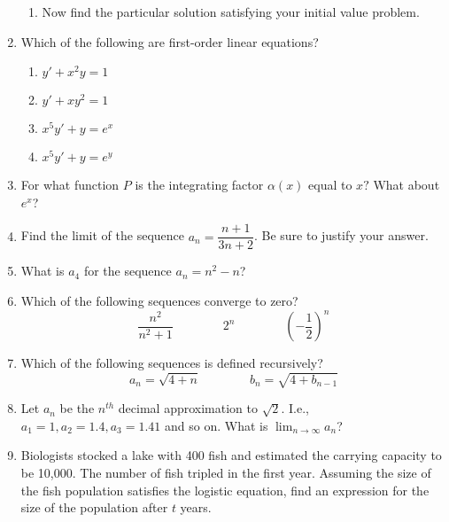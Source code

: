 \documentclass{nosvagor-notes}
\begin{document}
\begin{enumerate}
\begin{enumerate}
      \item Now find the particular solution satisfying your initial value problem.
        \vspace{140pt}
    \end{enumerate}

  \item Which of the following are first-order linear equations?
    \begin{multicols}{2}
    \begin{enumerate}
      \item \(y' + x^2y = 1\)
      \item \(y' + xy^2 = 1\)
      \item \(x^5y' + y = e^x\)
      \item \(x^5y' + y = e^y\)
    \end{enumerate}
    \end{multicols}
    \vspace{80pt}

  \item For what function \(P\) is the integrating factor \(\alpha (x) \) equal
    to \(x?\) What about \(e^x\)?
  \newpage

  \newpage

  \item Find the limit of the sequence \(a_n = \dfrac{n+1}{3n+2}\). Be sure to justify your answer.
  \vspace{256pt}

  \item What is \(a_4\) for the sequence \(a_n = n^2 - n\)?
    \vspace{40pt}

  \item Which of the following sequences converge to zero?
    \[%
      \frac{n^2}{n^2+1} \qquad\qquad 2^n \qquad\qquad \left( -\frac{1}{2} \right) ^n
    \]%
    \vspace{40pt}

  \item Which of the following sequences is defined recursively?
    \[%
    a_n = \sqrt{4+n} \qquad \qquad b_n = \sqrt{4+b_{n-1}}
    \]%
    \vspace{40pt}

  \item Let \(a_n\) be the \(n^{th}\) decimal approximation to \(\sqrt{2} \).
    I.e., \(a_1 = 1, a_2 = 1.4, a_3 = 1.41\) and so on. What is \(\lim_{n \to
    \infty} a_n\)?
  \newpage

  \item Biologists stocked a lake with 400 fish and estimated the carrying
    capacity to be 10,000. The number of fish tripled in the first year.
    Assuming the size of the fish population satisfies the logistic equation,
    find an expression for the size of the population after \(t\) years.


\end{enumerate}
\end{document}
